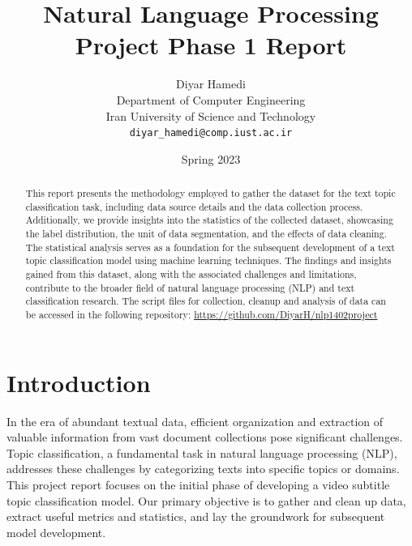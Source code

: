 \documentclass{article}
\title{Natural Language Processing Project Phase 1 Report}
\author{
  Diyar Hamedi\\
  Department of Computer Engineering\\
  Iran University of Science and Technology\\
  \texttt{diyar\_hamedi@comp.iust.ac.ir}\\
}
\date{Spring 2023}
\begin{document}
\pagestyle{fancy}
\fancyhead{}
\setlength{\headheight}{35.11143pt}

\maketitle

\begin{abstract}
  This report presents the methodology employed to gather the dataset for the text topic classification task, including data source details and the data collection process.
  Additionally, we provide insights into the statistics of the collected dataset, showcasing the label distribution, the unit of data segmentation, and the effects of data cleaning.
  The statistical analysis serves as a foundation for the subsequent development of a text topic classification model using machine learning techniques.
  The findings and insights gained from this dataset, along with the associated challenges and limitations, contribute to the broader field of natural language processing (NLP) and text classification research.
  The script files for collection, cleanup and analysis of data can be accessed in the following repository: \url{https://github.com/DiyarH/nlp1402project}
\end{abstract}

\section{Introduction}
In the era of abundant textual data, efficient organization and extraction of valuable information from vast document collections pose significant challenges.
Topic classification, a fundamental task in natural language processing (NLP), addresses these challenges by categorizing texts into specific topics or domains.
This project report focuses on the initial phase of developing a video subtitle topic classification model.
Our primary objective is to gather and clean up data, extract useful metrics and statistics, and lay the groundwork for subsequent model development.
\end{document}
